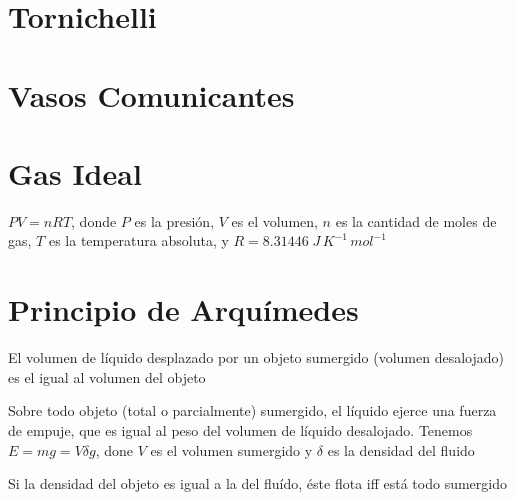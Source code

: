 \documentclass{article}
\begin{document}
\section{Tornichelli}
\section{Vasos Comunicantes}
\section{Gas Ideal}
\(
	PV = nRT
\), donde $P$ es la presión, $V$ es el volumen, $n$ es la cantidad de moles
de gas, $T$ es la temperatura absoluta, y $R = 8.31446 \;
J\,K^{-1}\,mol^{-1}$

\section{Principio de Arquímedes}
El volumen de líquido desplazado por un objeto sumergido (volumen
desalojado) es el igual al volumen del objeto

Sobre todo objeto (total o parcialmente) sumergido, el líquido ejerce una
fuerza de empuje, que es igual al peso del volumen de líquido desalojado.
Tenemos $E = mg = V\delta g$, done $V$ es el volumen sumergido y $\delta$ es
la densidad del fluido

Si la densidad del objeto es igual a la del fluído, éste flota iff está todo
sumergido
\end{document}
